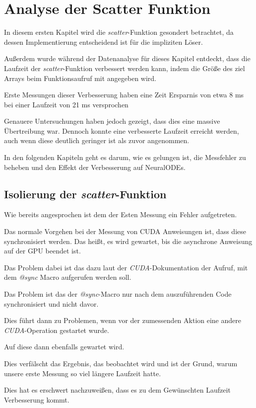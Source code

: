 
\section{Analyse der Scatter Funktion}

In diesem ersten Kapitel wird die \textit{scatter}-Funktion gesondert betrachtet, da
dessen Implementierung entscheidend ist für die impliziten Löser.

Außerdem wurde während der Datenanalyse für dieses Kapitel entdeckt,
dass die Laufzeit der \textit{scatter}-Funktion verbessert werden kann, 
indem die Größe des ziel Arrays beim Funktionsaufruf mit angegeben wird.

Erste Messungen dieser Verbesserung haben eine Zeit Ersparnis von etwa 8 ms bei einer Laufzeit von 21 ms 
versprochen

Genauere Untersuchungen haben jedoch gezeigt, dass dies eine massive Übertreibung war.
Dennoch konnte eine verbesserte Laufzeit erreicht werden, auch wenn diese deutlich geringer ist als zuvor angenommen.

In den folgenden Kapiteln geht es darum, wie es gelungen ist, die Messfehler zu beheben und den Effekt der Verbesserung auf NeuralODEs.


\subsection{Isolierung der \textit{scatter}-Funktion}

Wie bereits angesprochen ist dem der Esten Messung ein Fehler aufgetreten.

Das normale Vorgehen bei der Messung von CUDA Anweisungen ist, 
dass diese synchronisiert werden.
Das heißt, es wird gewartet, bis die asynchrone Anweisung auf der GPU beendet ist.

Das Problem dabei ist das dazu laut der \textit{CUDA}-Dokumentation der Aufruf, mit dem \textit{@sync} Macro aufgerufen werden soll.

Das Problem ist das der \textit{@sync}-Macro nur nach dem auszuführenden Code synchronisiert und nicht davor.

Dies führt dann zu Problemen, wenn vor der zumessenden Aktion eine andere \textit{CUDA}-Operation gestartet wurde.

Auf diese dann ebenfalls gewartet wird. 

Dies verfälscht das Ergebnis, das beobachtet wird und ist der Grund, warum unsere erste Messung so viel längere Laufzeit hatte.

Dies hat es erschwert nachzuweißen, dass es zu dem Gewünschten Laufzeit Verbesserung kommt.

